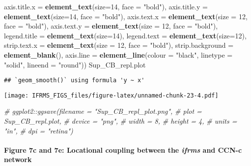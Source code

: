 \documentclass[
]{article}
\newenvironment{Shaded}{\begin{snugshade}}{\end{snugshade}}
\newcommand{\CommentTok}[1]{\textcolor[rgb]{0.56,0.35,0.01}{\textit{#1}}}
\newcommand{\DataTypeTok}[1]{\textcolor[rgb]{0.13,0.29,0.53}{#1}}
\newcommand{\DecValTok}[1]{\textcolor[rgb]{0.00,0.00,0.81}{#1}}
\newcommand{\KeywordTok}[1]{\textcolor[rgb]{0.13,0.29,0.53}{\textbf{#1}}}
\newcommand{\NormalTok}[1]{#1}
\newcommand{\StringTok}[1]{\textcolor[rgb]{0.31,0.60,0.02}{#1}}
\begin{document}
\begin{Shaded}
\begin{Highlighting}[]
         \DataTypeTok{axis.title.x =} \KeywordTok{element_text}\NormalTok{(}\DataTypeTok{size=}\DecValTok{14}\NormalTok{, }\DataTypeTok{face =} \StringTok{"bold"}\NormalTok{),}
         \DataTypeTok{axis.title.y =} \KeywordTok{element_text}\NormalTok{(}\DataTypeTok{size=}\DecValTok{14}\NormalTok{, }\DataTypeTok{face =} \StringTok{"bold"}\NormalTok{),}
         \DataTypeTok{axis.text.x =} \KeywordTok{element_text}\NormalTok{(}\DataTypeTok{size =} \DecValTok{12}\NormalTok{, }\DataTypeTok{face =} \StringTok{"bold"}\NormalTok{),}
         \DataTypeTok{axis.text.y =} \KeywordTok{element_text}\NormalTok{(}\DataTypeTok{size =} \DecValTok{12}\NormalTok{, }\DataTypeTok{face =} \StringTok{"bold"}\NormalTok{),}
         \DataTypeTok{legend.title =} \KeywordTok{element_text}\NormalTok{(}\DataTypeTok{size=}\DecValTok{14}\NormalTok{), }
         \DataTypeTok{legend.text =} \KeywordTok{element_text}\NormalTok{(}\DataTypeTok{size=}\DecValTok{12}\NormalTok{),}
         \DataTypeTok{strip.text.x =} \KeywordTok{element_text}\NormalTok{(}\DataTypeTok{size =} \DecValTok{12}\NormalTok{, }\DataTypeTok{face =} \StringTok{"bold"}\NormalTok{),}
         \DataTypeTok{strip.background =} \KeywordTok{element_blank}\NormalTok{(),}
         \DataTypeTok{axis.line =} \KeywordTok{element_line}\NormalTok{(}\DataTypeTok{colour =} \StringTok{"black"}\NormalTok{, }\DataTypeTok{linetype =} \StringTok{"solid"}\NormalTok{, }\DataTypeTok{lineend =} \StringTok{"round"}\NormalTok{)) }
\NormalTok{Sup_CB_repl.plot}
\end{Highlighting}
\end{Shaded}

\begin{verbatim}
## `geom_smooth()` using formula 'y ~ x'
\end{verbatim}

\texttt{[image: IFRMS\_FIGS\_files/figure-latex/unnamed-chunk-23-4.pdf]}

\begin{Shaded}
\begin{Highlighting}[]
\CommentTok{# ggplot2::ggsave(filename = "Sup_CB_repl_plot.png",}
\CommentTok{#                 plot = Sup_CB_repl.plot,}
\CommentTok{#                 device = "png",}
\CommentTok{#                 width = 8,}
\CommentTok{#                 height = 4, }
\CommentTok{#                 units = "in",}
\CommentTok{#                 dpi = "retina") }
\end{Highlighting}
\end{Shaded}

\hypertarget{figure-7c-and-7e-locational-coupling-between-the-ifrms-and-ccn-c-network}{%
\paragraph{\texorpdfstring{Figure 7c and 7e: Locational coupling between
the \emph{ifrms} and CCN-c
network}{Figure 7c and 7e: Locational coupling between the ifrms and CCN-c network}}\label{figure-7c-and-7e-locational-coupling-between-the-ifrms-and-ccn-c-network}}
\end{document}
